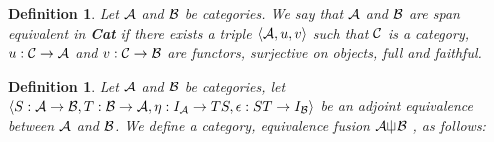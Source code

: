 \documentclass[12pt]{article}
\theoremstyle{plain}
\newtheorem{definition}[theorem]{Definition}
\theoremstyle{definition}
\begin{document}
\begin{definition}
Let ${\cal A}$ and ${\cal B}$ be categories. We say that ${\cal A}$ and ${\cal B}$ are \emph{span equivalent in {\bf Cat}} if there exists a triple $\langle {\cal A}, u, v \rangle$ such that ${\cal C}$ is a category, $u: {\cal C} \rightarrow {\cal A}$ and $v: {\cal C} \rightarrow {\cal B}$ are functors, surjective on objects, full and faithful.
\end{definition}

\begin{definition}
Let ${\cal A}$ and ${\cal B}$ be categories, let $\langle S:{\cal A}\rightarrow{\cal B}, T:{\cal B} \rightarrow {\cal A}, \eta :I_{{\cal A}} \rightarrow TS , \epsilon :ST \rightarrow I_{{\cal B}} \rangle$ be an adjoint equivalence between ${\cal A}$ and ${\cal B}$. We define a category, {\rm equivalence fusion} ${\cal A}\sqcup \hspace{-.76em} \mid {\cal B}$ , as follows:


\end{definition}
\end{document}

